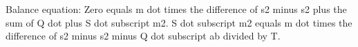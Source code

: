 Balance equation:
Zero equals m dot times the difference of s2 minus s2 plus the sum of Q dot plus S dot subscript m2.
S dot subscript m2 equals m dot times the difference of s2 minus s2 minus Q dot subscript ab divided by T.